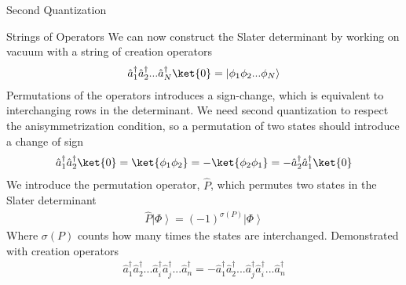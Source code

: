 \documentclass[twoside,english]{uiofysmaster}
\begin{document}
\begin{chapter}{Second Quantization}
	\begin{section}{Strings of Operators}
		We can now construct the Slater determinant by working on vacuum with a string of creation operators
		\begin{align}
			\hat a_1^{\dagger} \hat a_2^{\dagger}... \hat a_N^{\dagger} \ket{0} = \left| \phi_1 \phi_2 ... \phi_N \right>
		\end{align}
		Permutations of the operators introduces a sign-change, which is equivalent to interchanging rows in the determinant. We need second quantization to respect the anisymmetrization condition, so a permutation of two states should introduce a change of sign
		\begin{align}
			\hat a_1^{\dagger} \hat a_2^{\dagger} \ket{0} = \ket{\phi_1 \phi_2} = -\ket{\phi_2 \phi_1} = -\hat a_2^{\dagger} \hat a_1^{\dagger} \ket{0}
		\end{align}
		We introduce the permutation operator, $\hat P$, which permutes two states in the Slater determinant 
		\begin{align}
			\hat P \left| \Phi \right> = (-1)^{\sigma(P)} \left| \Phi \right>
		\end{align}
		Where $\sigma(P)$ counts how many times the states are interchanged. Demonstrated with creation operators
		\begin{align}
			\hat a_1^\dagger \hat a_2^\dagger ... \hat a_i^\dagger \hat a_j^\dagger ... \hat a_n^\dagger = - \hat a_1^\dagger \hat a_2^\dagger ... \hat a_j^\dagger \hat a_i^\dagger ... \hat a_n^\dagger
		\end{align}
	\end{section}


\end{chapter}
\end{document}
